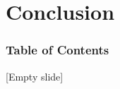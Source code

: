\section{Conclusion}
\begin{frame}
\frametitle{Table of Contents}
\tableofcontents[currentsection]
\end{frame}

\begin{frame}{}{}
  {[Empty slide]}
\end{frame}
